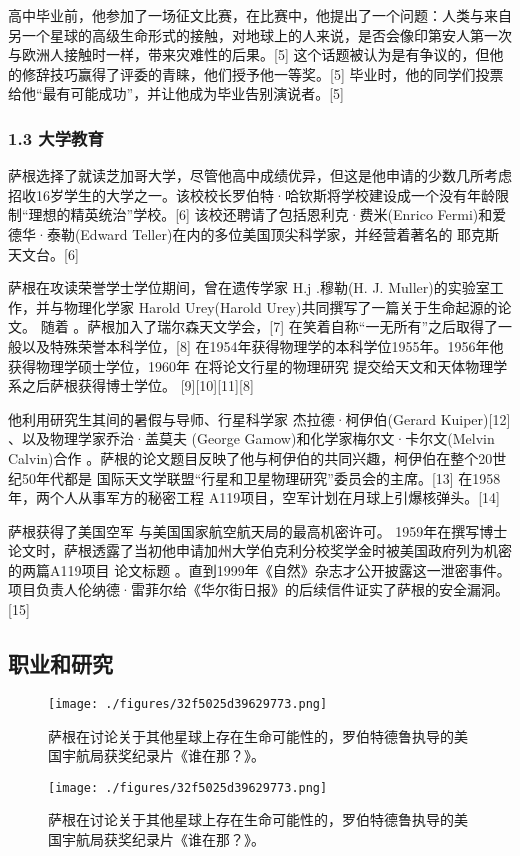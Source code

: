 高中毕业前，他参加了一场征文比赛，在比赛中，他提出了一个问题：人类与来自另一个星球的高级生命形式的接触，对地球上的人来说，是否会像印第安人第一次与欧洲人接触时一样，带来灾难性的后果。[5] 这个话题被认为是有争议的，但他的修辞技巧赢得了评委的青睐，他们授予他一等奖。[5] 毕业时，他的同学们投票给他“最有可能成功”，并让他成为毕业告别演说者。[5]
\subsubsection{1.3 大学教育}
萨根选择了就读芝加哥大学，尽管他高中成绩优异，但这是他申请的少数几所考虑招收16岁学生的大学之一。该校校长罗伯特·哈钦斯将学校建设成一个没有年龄限制“理想的精英统治”学校。[6] 该校还聘请了包括恩利克·费米(Enrico Fermi)和爱德华·泰勒(Edward Teller)在内的多位美国顶尖科学家，并经营着著名的 耶克斯天文台。[6]

萨根在攻读荣誉学士学位期间，曾在遗传学家 H.j .穆勒(H. J. Muller)的实验室工作，并与物理化学家 Harold Urey(Harold Urey)共同撰写了一篇关于生命起源的论文。 随着 。萨根加入了瑞尔森天文学会，[7] 在笑着自称“一无所有”之后取得了一般以及特殊荣誉本科学位，[8] 在1954年获得物理学的本科学位1955年。1956年他获得物理学硕士学位，1960年 在将论文行星的物理研究 提交给天文和天体物理学系之后萨根获得博士学位。 [9][10][11][8]

他利用研究生其间的暑假与导师、行星科学家 杰拉德·柯伊伯(Gerard Kuiper)[12] 、以及物理学家乔治·盖莫夫 (George Gamow)和化学家梅尔文·卡尔文(Melvin Calvin)合作 。萨根的论文题目反映了他与柯伊伯的共同兴趣，柯伊伯在整个20世纪50年代都是 国际天文学联盟“行星和卫星物理研究”委员会的主席。[13] 在1958年，两个人从事军方的秘密工程 A119项目，空军计划在月球上引爆核弹头。[14]

萨根获得了美国空军 与美国国家航空航天局的最高机密许可。 1959年在撰写博士论文时，萨根透露了当初他申请加州大学伯克利分校奖学金时被美国政府列为机密的两篇A119项目 论文标题 。直到1999年《自然》杂志才公开披露这一泄密事件。项目负责人伦纳德·雷菲尔给《华尔街日报》的后续信件证实了萨根的安全漏洞。[15]

\subsection{ 职业和研究}
\begin{figure}[ht]
\centering
\texttt{[image: ./figures/32f5025d39629773.png]}
\caption{萨根在讨论关于其他星球上存在生命可能性的，罗伯特德鲁执导的美国宇航局获奖纪录片《谁在那？》。} \label{fig_Sagan_2}
\end{figure}\begin{figure}[ht]
\centering
\texttt{[image: ./figures/32f5025d39629773.png]}
\caption{萨根在讨论关于其他星球上存在生命可能性的，罗伯特德鲁执导的美国宇航局获奖纪录片《谁在那？》。} \label{fig_Sagan_3}
\end{figure}